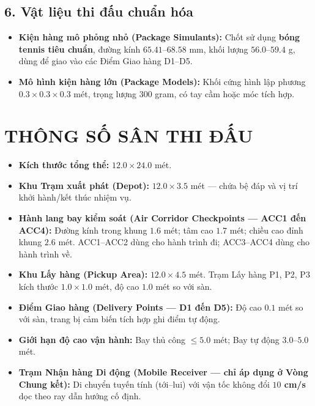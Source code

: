 \documentclass[12pt,a4paper]{article}
\begin{document}
\subsection*{6. Vật liệu thi đấu chuẩn hóa}
\begin{itemize}
\item \textbf{Kiện hàng mô phỏng nhỏ (Package Simulants):} Chốt sử dụng \textbf{bóng tennis tiêu chuẩn}, đường kính $65.41$–$68.58$ mm, khối lượng $56.0$–$59.4$ g, dùng để giao vào các Điểm Giao hàng D1–D5.
\item \textbf{Mô hình kiện hàng lớn (Package Models):} Khối cứng hình lập phương $0.3 \times 0.3 \times 0.3$ mét, trọng lượng $300$ gram, có tay cầm hoặc móc tích hợp.
\end{itemize}

\section{THÔNG SỐ SÂN THI ĐẤU}

\begin{itemize}
\item \textbf{Kích thước tổng thể:} $12.0 \times 24.0$ mét.
\item \textbf{Khu Trạm xuất phát (Depot):} $12.0 \times 3.5$ mét — chứa bệ đáp và vị trí khởi hành/kết thúc nhiệm vụ.
\item \textbf{Hành lang bay kiểm soát (Air Corridor Checkpoints — ACC1 đến ACC4):} Đường kính trong khung $1.6$ mét; tâm cao $1.7$ mét; chiều cao đỉnh khung $2.6$ mét. ACC1–ACC2 dùng cho hành trình đi; ACC3–ACC4 dùng cho hành trình về.
\item \textbf{Khu Lấy hàng (Pickup Area):} $12.0 \times 4.5$ mét. Trạm Lấy hàng P1, P2, P3 kích thước $1.0 \times 1.0$ mét, độ cao $1.0$ mét so với sàn.
\item \textbf{Điểm Giao hàng (Delivery Points — D1 đến D5):} Độ cao $0.1$ mét so với sàn, trang bị cảm biến tích hợp ghi điểm tự động.
\item \textbf{Giới hạn độ cao vận hành:} Bay thủ công $\leq 5.0$ mét; Bay tự động $3.0$–$5.0$ mét.
\item \textbf{Trạm Nhận hàng Di động (Mobile Receiver — chỉ áp dụng ở Vòng Chung kết):} Di chuyển tuyến tính (tới–lui) với vận tốc không đổi \textbf{$10$ cm/s} dọc theo ray dẫn hướng cố định.
\end{itemize}
\end{document}
